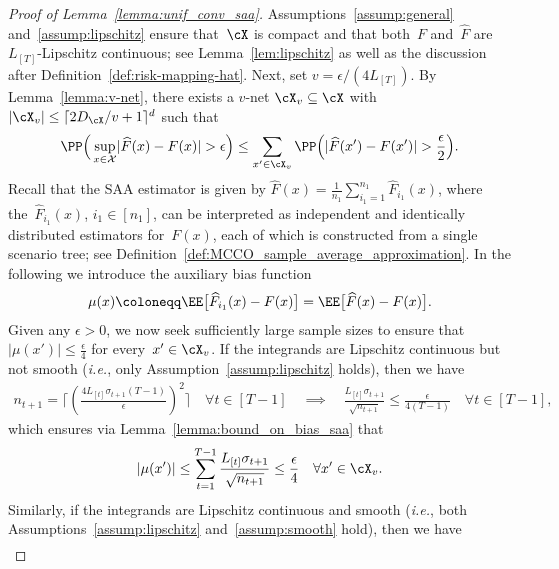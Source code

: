 \documentclass[11pt]{article}
\let\hat\widehat
\begin{document}
\begin{proof}[Proof of Lemma~\ref{lemma:unif_conv_saa}] 
Assumptions~\ref{assump:general} and~\ref{assump:lipschitz} ensure that~$\cX$ is compact and that both~$F$ and~$\hat{F}$ are $L_{[T]}$-Lipschitz continuous; see Lemma~\ref{lem:lipschitz} as well as the discussion after Definition~\ref{def:risk-mapping-hat}. Next, set $v=\epsilon/(4L_{[T]})$. By Lemma~\ref{lemma:v-net}, there exists a $v$-net $\cX_v\subseteq \cX$ with $|\cX_v|\leq \lceil 2D_{\cX}/v + 1\rceil^d$ such that
\begin{align}
    \label{eq:sumoverJ}
    \PP\Big(\sup_{x\in \mathcal{X}} \lvert \hat{F}(x) - F(x) \rvert > \epsilon \Big) \leq \sum_{x^\prime\in\cX_v} \PP\Big( \lvert  \hat{F}(x^\prime) - F(x^\prime) \rvert  > \frac{\epsilon}{2}\Big).
\end{align}
Recall that the SAA estimator is given by $\hat{F}(x) = \frac{1}{n_1} \sum_{i_1=1}^{n_1} \hat{F}_{i_1}(x)$, where the~$\hat{F}_{i_1}(x)$, $i_1\in[n_1]$, can be interpreted as independent and identically distributed estimators for~$F(x)$, each of which is constructed from a single scenario tree; see Definition~\ref{def:MCCO_sample_average_approximation}. In the following we introduce the auxiliary bias function
\begin{align*}
    \mu(x)\coloneqq\EE\big[\hat{F}_{i_1}(x)-F(x)\big] = \EE\big[\hat{F}(x)-F(x)\big].
\end{align*}
Given any $\epsilon>0$, we now seek sufficiently large sample sizes to ensure that $|\mu(x')|\leq \frac{\epsilon}{4}$ for every~$x'\in\cX_v$. If the integrands are Lipschitz continuous but not smooth ({\em i.e.}, only Assumption~\ref{assump:lipschitz} holds), then we have
\begin{align*}
    n_{t+1} =\bigg\lceil\left( \frac{4L_{[t]}\sigma_{t+1} (T-1)}{\epsilon} \right)^2\bigg\rceil \quad \forall t\in[T-1]\quad \implies\quad  \frac{L_{[t]}\sigma_{t+1}}{\sqrt{n_{t+1}}} \leq \frac{\epsilon}{4(T-1)} \quad \forall t\in[T-1],
\end{align*}
which ensures via Lemma~\ref{lemma:bound_on_bias_saa} that
\begin{align*}
    \left| \mu(x^\prime) \right| \leq \sum_{t=1}^{T-1} \frac{L_{[t]}\sigma_{t+1}}{\sqrt{n_{t+1}}} \leq \frac{\epsilon}{4} \quad \forall x'\in\cX_v.
\end{align*}
Similarly, if the integrands are Lipschitz continuous and smooth ({\em i.e.}, both Assumptions~\ref{assump:lipschitz} and~\ref{assump:smooth} hold), then we have
\begin{align*}

\end{align*}
\end{proof}
\end{document}
